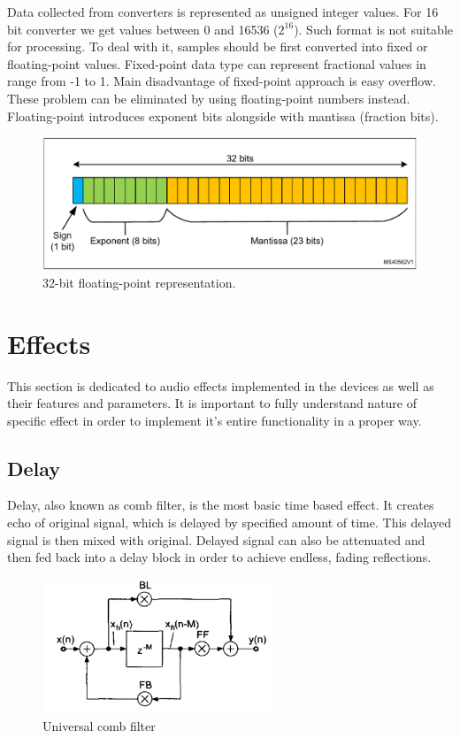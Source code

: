 \documentclass[a4paper,twoside,12pt]{book}
\begin{document}
Data collected from converters is represented as unsigned integer values.
For 16 bit converter we get values between 0 and 16536 (\(2^16\)).
Such format is not suitable for processing.
To deal with it, samples should be first converted into fixed or floating-point values.
Fixed-point data type can represent fractional values in range from -1 to 1.
Main disadvantage of fixed-point approach is easy overflow.
These problem can be eliminated by using floating-point numbers instead.
Floating-point introduces exponent bits alongside with mantissa (fraction bits).
\cite{ST:DSP}

\begin{figure}[H]
    \centering
    \includegraphics[width=\textwidth]{images/float}
    \caption{32-bit floating-point representation.}
    \label{fig:Float}
\end{figure}

\section{Effects}
This section is dedicated to audio effects implemented in the devices
as well as their features and parameters.
It is important to fully understand nature of specific effect
in order to implement it's entire functionality in a proper way.
\cite{Zolzer1}
\cite{Zolzer2}
\cite{Smith}

\subsection{Delay}
Delay, also known as comb filter, is the most basic time based effect.
It creates echo of original signal,
which is delayed by specified amount of time.
This delayed signal is then mixed with original.
Delayed signal can also be attenuated and then fed back into a delay block
in order to achieve endless, fading reflections.

\begin{figure}[H]
    \centering
    \includegraphics[width=0.618\textwidth]{images/comb}
    \caption{Universal comb filter}
    \label{fig:comb}
\end{figure}
\end{document}
